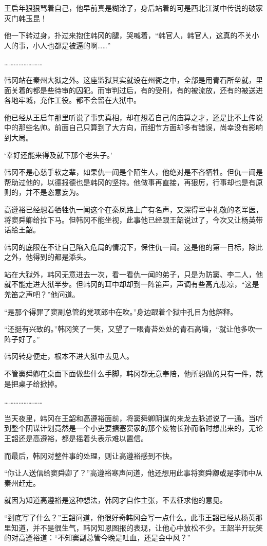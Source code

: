 王启年狠狠骂着自己，他早前真是糊涂了，身后站着的可是西北江湖中传说的破家灭门韩玉昆！

他一下转过身，扑过来抱住韩冈的腿，哭喊着，“韩官人，韩官人，这真的不关小人的事，小人也都是被逼的啊……”

……………………

韩冈站在秦州大狱之外。这座监狱其实就设在州衙之中，全部是用青石所垒就，里面关着的都是些待审的囚犯。而审判过后，有的受刑，有的被流放，还有的被送进各地牢城，充作工役。都不会留在大狱中。

他已经从王启年那里听说了事实真相，却在想着自己的庙算之才，还是比不上传说中的那些名帅。前面自己只算到了大方向，而细节方面却多有错误，尚幸没有影响到大局。

‘幸好还能来得及就下那个老头子。’

韩冈不是心慈手软之辈，如果仇一闻是个陌生人，他绝对是不吝牺牲。但仇一闻是帮助过他的，以德报德也是韩冈的坚持。他做事再直接，再狠厉，行事却也是有原则的，并不是恣意妄为。

高遵裕已经想着牺牲仇一闻这个在秦凤路上广有名声，又深得军中礼敬的老军医，将窦舜卿给拉下马。但韩冈不能坐视，此事他已经跟王韶说过了，今次又让杨英带话给王韶。

韩冈的底限在不让自己陷入危局的情况下，保住仇一闻。这是他的第一目标，除此之外，他得到的都是添头。

站在大狱外，韩冈无意进去一次，看一看仇一闻的弟子，只是为防窦、李二人，他就不能走进大狱半步。但韩冈的耳中却却到一阵笛声，声调有些高亢悲凉，“这是羌笛之声吧？”他问道。

“是那个得罪了窦副总管的党项郎中在吹。”身边跟着个狱中孔目为他解释。

“还挺有兴致的。”韩冈笑了一笑，又望了一眼青苔处处的青石高墙，“就让他多吹一阵子好了。”

韩冈转身便走，根本不进大狱中去见人。

不管窦舜卿在桌面下面做些什么手脚，韩冈都无意奉陪，他所想做的只有一件，就是把桌子给掀掉。

……………………

当天夜里，韩冈在王韶和高遵裕面前，将窦舜卿阴谋的来龙去脉述说了一通。当听到整个阴谋计划竟然是一个小吏要搪塞窦家的那个废物长孙而临时想出来的，无论王韶还是高遵裕，都是摇着头表示难以置信。

而最后，韩冈对整件事的处理，则让高遵裕感到不快。

“你让人送信给窦舜卿了？”高遵裕寒声问道，他还想用此事将窦舜卿或是李师中从秦州赶走。

就因为知道高遵裕是这种想法，韩冈才自作主张，不去征求他的意见。

“到底写了什么？”王韶问道，他很好奇韩冈会写一点什么。此事王韶已经从杨英那里知道，并不是很生气，韩冈知恩图报的表现，让他心中放松不少。王韶半开玩笑的对高遵裕道：“不知窦副总管今晚是吐血，还是会中风？”

